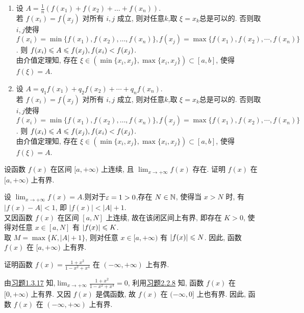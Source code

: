 \begin{solution}
    \begin{enumerate}
        \item 设 $A = \frac{1}{n}(f(x_1)+f(x_2)+\dots+f(x_n))$. \\
        若 $f(x_i) = f(x_j)$ 对所有 $i,j$ 成立, 则对任意$k$,取 $\xi = x_k$总是可以的. 否则取$i,j$使得 $f(x_i) = \min\{f(x_1), f(x_2), \dots, f(x_n)\}, f(x_j) = \max\{f(x_1), f(x_2), \cdots, f(x_n)\}$. 则 $f(x_i) \leqslant A \leqslant f(x_j),f(x_i) < f(x_j)$. \\由介值定理知, 存在 $\xi \in (\min\{x_i, x_j\},\max\{x_i, x_j\})\subset [a,b]$, 使得 $f(\xi) = A$.
        \item 设 $A = q_1f(x_1)+q_2f(x_2)+\cdots+q_nf(x_n)$. \\
        若 $f(x_i) = f(x_j)$ 对所有 $i,j$ 成立, 则对任意$k$,取 $\xi = x_k$总是可以的. 否则取$i,j$使得 $f(x_i) = \min\{f(x_1), f(x_2), \dots, f(x_n)\}, f(x_j) = \max\{f(x_1), f(x_2), \cdots, f(x_n)\}$. 则 $f(x_i) \leqslant A \leqslant f(x_j),f(x_i) < f(x_j)$. \\由介值定理知, 存在 $\xi \in (\min\{x_i, x_j\},\max\{x_i, x_j\})\subset [a,b]$, 使得 $f(\xi) = A$.
    \end{enumerate}
\end{solution}

\begin{exercise}[2.2.8]\label{exe:2.2.8}
    设函数 $f(x)$ 在区间 $[a, +\infty)$ 上连续, 且 $\lim_{x \to +\infty} f(x)$ 存在. 证明 $f(x)$ 在 $[a, +\infty)$ 上有界.
\end{exercise}

\begin{solution}
    设 $\lim_{x \to +\infty} f(x) = A$.则对于$\varepsilon=1>0$,存在 $N \in \mathbb{N}$, 使得当 $x > N$ 时, 有 $|f(x) - A| < 1$, 即 $|f(x)| < |A| + 1$.\\
    又因函数 $f(x)$ 在区间 $[a,N]$ 上连续, 故在该闭区间上有界, 即存在 $K > 0$, 使得对任意 $x \in [a,N]$ 有 $|f(x)| \leqslant K$. \\
    取 $M = \max\{K, |A| + 1\}$, 则对任意 $x \in [a, +\infty)$ 有 $|f(x)| \leqslant N$. 因此, 函数 $f(x)$ 在 $[a, +\infty)$ 上有界.
\end{solution}

\begin{exercise}[2.2.9]
    证明函数 $f(x) = \frac{1+x^2}{1-x^2+x^4}$ 在 $(-\infty, +\infty)$ 上有界.
\end{exercise}

\begin{solution}
    由\hyperref[{exe:1.3.17}]{习题1.3.17} 知,$\lim_{x \to +\infty} \frac{1+x^2}{1-x^2+x^4} = 0$, 利用\hyperref[exe:2.2.8]{习题2.2.8} 知, 函数 $f(x)$ 在 $[0, +\infty)$ 上有界. 又因 $f(x)$ 是偶函数, 故 $f(x)$ 在 $(-\infty, 0]$ 上也有界. 因此, 函数 $f(x)$ 在 $(-\infty, +\infty)$ 上有界.
\end{solution}

